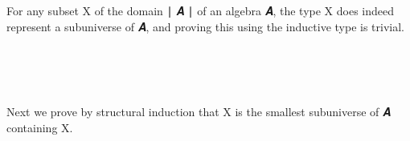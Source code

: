 For any subset \ab X of the domain \af ∣ \ab 𝑨 \af ∣ of an algebra \ab 𝑨, the type  \ab X does indeed represent a subuniverse of \ab 𝑨, and proving this using the inductive type  is trivial.
\ccpad
\begin{code}%
\>[0]\AgdaSpace{}%
\AgdaModule{\AgdaUnderscore{}}\AgdaSpace{}%
\AgdaSymbol{\{}\AgdaSpace{}%
\AgdaSpace{}%
\AgdaSymbol{:}\AgdaSpace{}%
\AgdaSymbol{\}}\AgdaSpace{}%
\<%
\\
%
\\[\AgdaEmptyExtraSkip]%
\>[0][@{}l@{\AgdaIndent{0}}]%
\>[1]\AgdaSpace{}%
\AgdaSymbol{:}\AgdaSpace{}%
\AgdaSymbol{\{}\AgdaSpace{}%
\AgdaSymbol{:}\AgdaSpace{}%
\AgdaSpace{}%
\AgdaSpace{}%
\AgdaSymbol{\}\{}\AgdaSpace{}%
\AgdaSymbol{:}\AgdaSpace{}%
\AgdaSpace{}%
\AgdaSpace{}%
\AgdaSpace{}%
\AgdaSpace{}%
\AgdaSymbol{\}}\AgdaSpace{}%
\AgdaSpace{}%
\AgdaSpace{}%
\AgdaSpace{}%
\AgdaSpace{}%
\AgdaSpace{}%
\AgdaSpace{}%
\<%
\\
%
\>[1]\AgdaSpace{}%
\AgdaSymbol{=}\AgdaSpace{}%
\<%
\end{code}
\ccpad
Next we prove by structural induction that  \ab X is the smallest subuniverse of \ab 𝑨 containing \ab X.
\ccpad
